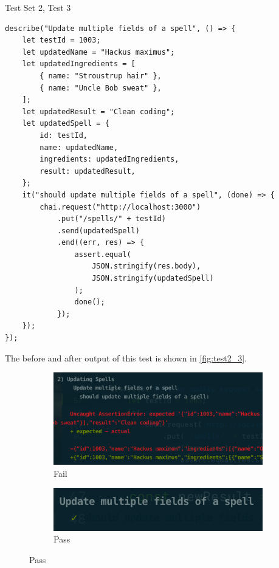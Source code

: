 \begin{listing}[h]
\caption{Test Set 2, Test 3}
\label{lis:test2_3}
\begin{verbatim}
describe("Update multiple fields of a spell", () => {
	let testId = 1003;
	let updatedName = "Hackus maximus";
	let updatedIngredients = [
		{ name: "Stroustrup hair" },
		{ name: "Uncle Bob sweat" },
	];
	let updatedResult = "Clean coding";
	let updatedSpell = {
		id: testId,
		name: updatedName,
		ingredients: updatedIngredients,
		result: updatedResult,
	};
	it("should update multiple fields of a spell", (done) => {
		chai.request("http://localhost:3000")
			.put("/spells/" + testId)
			.send(updatedSpell)
			.end((err, res) => {
				assert.equal(
					JSON.stringify(res.body),
					JSON.stringify(updatedSpell)
				);
				done();
			});
	});
});

\end{verbatim}
\end{listing}
The before and after output of this test is shown in \autoref{fig:test2_3}.
\begin{figure}[h]
\caption{Test output for test set 2, test 3}
\label{fig:test2_3}
	\centering
	\begin{subfigure}[b]{0.5\textwidth}
		\centering
		\includegraphics[width=\textwidth]{images/23_fail}
		\caption{Fail}
		\label{fig:test23_fail}
	\end{subfigure}
	\hfill
	\begin{subfigure}[b]{0.5\textwidth}
		\centering
		\includegraphics[width=\textwidth]{images/23_pass}
		\caption{Pass}
		\label{fig:test23_pass}
	\end{subfigure}
\end{figure}





